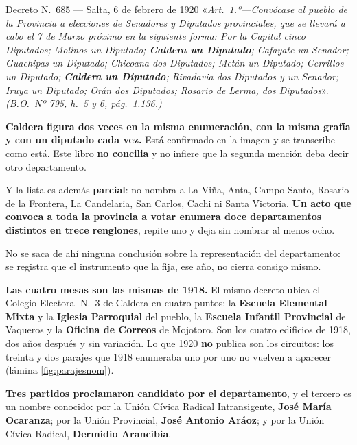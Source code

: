 \begin{ficha}{Decreto N.\ 685 --- Salta, 6 de febrero de 1920}
«\textit{Art.\ 1.º---Convócase al pueblo de la Provincia a elecciones de Senadores y Diputados
provinciales, que se llevará a cabo el 7 de Marzo próximo en la siguiente forma: Por la Capital
cinco Diputados; Molinos un Diputado; \textbf{Caldera un Diputado}; Cafayate un Senador;
Guachipas un Diputado; Chicoana dos Diputados; Metán un Diputado; Cerrillos un Diputado;
\textbf{Caldera un Diputado}; Rivadavia dos Diputados y un Senador; Iruya un Diputado; Orán dos
Diputados; Rosario de Lerma, dos Diputados}».
\textit{(B.O.\ Nº 795, h.\ 5 y 6, pág.\ 1.136.)}
\end{ficha}

\begin{cautela}
\textbf{Caldera figura dos veces en la misma enumeración, con la misma grafía y con un diputado
cada vez.} Está confirmado en la imagen y se transcribe como está. Este libro \textbf{no concilia}
y no infiere que la segunda mención deba decir otro departamento.

Y la lista es además \textbf{parcial}: no nombra a La Viña, Anta, Campo Santo, Rosario de la
Frontera, La Candelaria, San Carlos, Cachi ni Santa Victoria. \textbf{Un acto que convoca a toda
la provincia a votar enumera doce departamentos distintos en trece renglones}, repite uno y deja
sin nombrar al menos ocho.

No se saca de ahí ninguna conclusión sobre la representación del departamento: se registra que el
instrumento que la fija, ese año, no cierra consigo mismo.
\end{cautela}

\textbf{Las cuatro mesas son las mismas de 1918.} El mismo decreto ubica el Colegio Electoral
N.\ 3 de Caldera en cuatro puntos: la \textbf{Escuela Elemental Mixta} y la \textbf{Iglesia
Parroquial} del pueblo, la \textbf{Escuela Infantil Provincial} de Vaqueros y la \textbf{Oficina
de Correos} de Mojotoro. Son los cuatro edificios de 1918, dos años después y sin variación. Lo
que 1920 \textbf{no} publica son los circuitos: los treinta y dos parajes que 1918 enumeraba uno
por uno no vuelven a aparecer (lámina \ref{fig:parajesnom}).

\textbf{Tres partidos proclamaron candidato por el departamento}, y el tercero es un nombre
conocido: por la Unión Cívica Radical Intransigente, \textbf{José María Ocaranza}; por la Unión
Provincial, \textbf{José Antonio Aráoz}; y por la Unión Cívica Radical, \textbf{Dermidio
Arancibia}.

